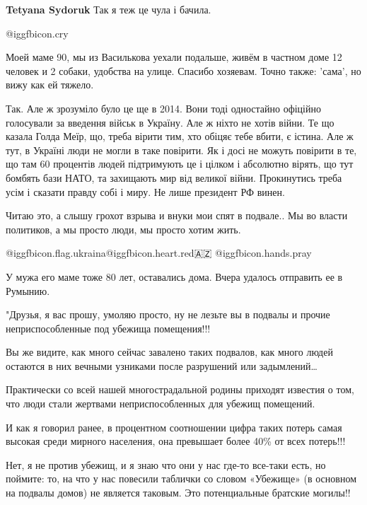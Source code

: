\begin{itemize}
\textbf{Tetyana Sydoruk} Так я теж це чула і бачила.

 @igg{fbicon.cry} 


Моей маме 90, мы из Василькова уехали подальше, живём в частном доме 12 человек
и 2 собаки, удобства на улице. Спасибо хозяевам. Точно также: 'сама', но вижу
как ей тяжело.


Так. Але ж зрозуміло було це ще в 2014. Вони тоді одностайно офіційно
голосували за введення військ в Україну. Але ж ніхто не хотів війни. Те що
казала Голда Меїр, що, треба вірити тим, хто обіцяє тебе вбити, є істина. Але ж
тут, в Україні люди не могли в таке повірити. Як і досі не можуть повірити в
те, що там 60 процентів людей підтримують це і цілком і абсолютно вірять, що
тут бомбять бази НАТО, та захищають мир від великої війни. Прокинутись треба
усім і сказати правду собі і миру. Не лише президент РФ винен.

Читаю это, а слышу грохот взрыва и внуки мои спят в подвале..
Мы во власти политиков, а мы просто люди, мы просто хотим жить.

@igg{fbicon.flag.ukraina}@igg{fbicon.heart.red}🇦🇿 @igg{fbicon.hands.pray} 

У мужа его маме тоже 80 лет, оставались дома. Вчера удалось отправить ее в Румынию.


"Друзья, я вас прошу, умоляю просто, ну не лезьте вы в подвалы и прочие неприспособленные под убежища помещения!!!

Вы же видите, как много сейчас завалено таких подвалов, как много людей
остаются в них вечными узниками после разрушений или задымлений…

Практически со всей нашей многострадальной родины приходят известия о том, что
люди стали жертвами неприспособленных для убежищ помещений.

И как я говорил ранее, в процентном соотношении цифра таких потерь самая
высокая среди мирного населения, она превышает более 40\% от всех потерь!!!

Нет, я не против убежищ, и я знаю что они у нас где-то все-таки есть, но
поймите: то, на что у нас повесили таблички со словом «Убежище» (в основном на
подвалы домов) не является таковым. Это потенциальные братские могилы!!


\end{itemize}
